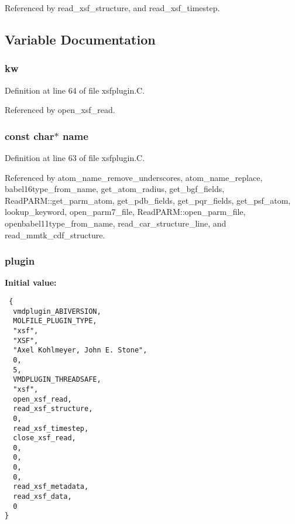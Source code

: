 Referenced by read\_\-xsf\_\-structure, and read\_\-xsf\_\-timestep.

\subsection{Variable Documentation}
\subsubsection{ kw}\label{xsfplugin_8C_a3}




Definition at line 64 of file xsfplugin.C.

Referenced by open\_\-xsf\_\-read.
\subsubsection{\setlength{\rightskip}{0pt plus 5cm}const char$\ast$ name}\label{xsfplugin_8C_a2}




Definition at line 63 of file xsfplugin.C.

Referenced by atom\_\-name\_\-remove\_\-underscores, atom\_\-name\_\-replace, babel16type\_\-from\_\-name, get\_\-atom\_\-radius, get\_\-bgf\_\-fields, Read\-PARM::get\_\-parm\_\-atom, get\_\-pdb\_\-fields, get\_\-pqr\_\-fields, get\_\-psf\_\-atom, lookup\_\-keyword, open\_\-parm7\_\-file, Read\-PARM::open\_\-parm\_\-file, openbabel11type\_\-from\_\-name, read\_\-car\_\-structure\_\-line, and read\_\-mmtk\_\-cdf\_\-structure.
\subsubsection{ plugin\hspace{0.3cm}{\tt  [static]}}\label{xsfplugin_8C_a5}


{\bf Initial value:}

\footnotesize\begin{verbatim} {
  vmdplugin_ABIVERSION,   
  MOLFILE_PLUGIN_TYPE,    
  "xsf",                  
  "XSF",                  
  "Axel Kohlmeyer, John E. Stone", 
  0,                      
  5,                      
  VMDPLUGIN_THREADSAFE,   
  "xsf",                  
  open_xsf_read,               
  read_xsf_structure,
  0,                      
  read_xsf_timestep,
  close_xsf_read,
  0,                      
  0,                      
  0,                      
  0,                      
  read_xsf_metadata,
  read_xsf_data,
  0                       
}\end{verbatim}\normalsize 


